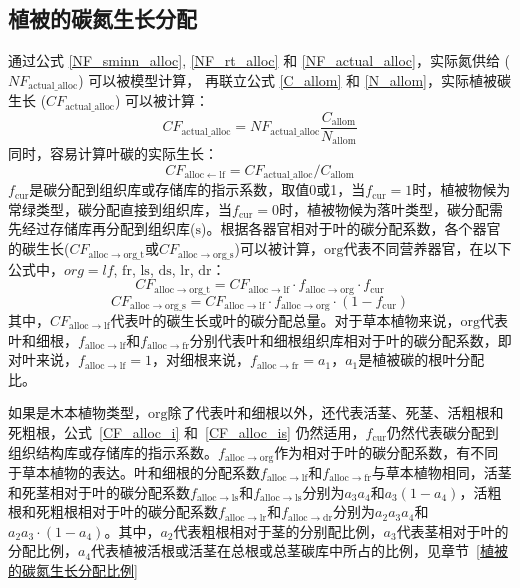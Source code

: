 \subsection{植被的碳氮生长分配}\label{植被的碳氮生长分配}
通过公式 \eqref{NF_sminn_alloc}, \eqref{NF_rt_alloc} 和 \eqref{NF_actual_alloc}，实际氮供给 ($NF_{\mathrm{actual\_alloc}}$) 可以被模型计算，
再联立公式 \eqref{C_allom} 和 \eqref{N_allom}，实际植被碳生长 ($CF_{\mathrm{actual\_alloc}}$) 可以被计算：
\begin{equation}
  CF_{\mathrm{actual\_alloc}} = NF_{\mathrm{actual\_alloc}}\frac{C_{\mathrm{allom}}}{N_{\mathrm{allom}}}
\end{equation}
同时，容易计算叶碳的实际生长：
\begin{equation}
  CF_{\mathrm{alloc \gets lf}} = CF_{\mathrm{actual\_alloc}}/C_{\mathrm{allom}}
\end{equation}
$f_{\mathrm{cur}}$是碳分配到组织库或存储库的指示系数，取值0或1，当$f_{\mathrm{cur}}=1$时，植被物候为常绿类型，碳分配直接到组织库，当$f_{\mathrm{cur}}=0$时，植被物候为落叶类型，碳分配需先经过存储库再分配到组织库(${\mathrm {s}}$)。根据各器官相对于叶的碳分配系数，各个器官的碳生长($CF_{\mathrm{alloc\rightarrow org\_t}}$或$CF_{\mathrm{alloc\rightarrow org\_s}}$)可以被计算，${\mathrm {org}}$代表不同营养器官，在以下公式中，$org=lf$, ${\mathrm {fr}}$, ${\mathrm {ls}}$, ${\mathrm {ds}}$, ${\mathrm {lr}}$, ${\mathrm {dr}}$：
\begin{equation}\label{CF_alloc_i}
  CF_{\mathrm{alloc\rightarrow org\_t}} = CF_{\mathrm{alloc\rightarrow lf}}\cdot f_{\mathrm{alloc\rightarrow org}} \cdot f_{\mathrm{cur}}
\end{equation}
\begin{equation}\label{CF_alloc_is}
  CF_{\mathrm{alloc\rightarrow org\_s}} = CF_{\mathrm{alloc\rightarrow lf}}\cdot f_{\mathrm{alloc\rightarrow org}} \cdot \left(1-f_{\mathrm{cur}}\right)
\end{equation}
其中，$CF_{\mathrm{alloc\rightarrow lf}}$代表叶的碳生长或叶的碳分配总量。对于草本植物来说，${\mathrm {org}}$代表叶和细根，$f_{\mathrm{alloc\rightarrow lf}}$和$f_{\mathrm{alloc\rightarrow fr}}$分别代表叶和细根组织库相对于叶的碳分配系数，即对叶来说，$f_{\mathrm{alloc\rightarrow lf}}=1$，对细根来说，$f_{\mathrm{alloc\rightarrow fr}}=a_1$，$a_1$是植被碳的根叶分配比。

如果是木本植物类型，${\mathrm {org}}$除了代表叶和细根以外，还代表活茎、死茎、活粗根和死粗根，公式~\eqref{CF_alloc_i} 和~\eqref{CF_alloc_is} 仍然适用，$f_{\mathrm{cur}}$仍然代表碳分配到组织结构库或存储库的指示系数。$f_{\mathrm{alloc\rightarrow org}}$作为相对于叶的碳分配系数，有不同于草本植物的表达。叶和细根的分配系数$f_{\mathrm{alloc\rightarrow lf}}$和$f_{\mathrm{alloc\rightarrow fr}}$与草本植物相同，活茎和死茎相对于叶的碳分配系数$f_{\mathrm{alloc\rightarrow ls}}$和$f_{\mathrm{alloc\rightarrow ls}}$分别为$a_3a_4$和$a_3\left(1-a_4\right)$，活粗根和死粗根相对于叶的碳分配系数$f_{\mathrm{alloc\rightarrow lr}}$和$f_{\mathrm{alloc\rightarrow dr}}$分别为$a_2a_3a_4$和$a_2a_3\cdot \left(1-a_4\right)$。其中，$a_2$代表粗根相对于茎的分别配比例，$a_3$代表茎相对于叶的分配比例，$a_4$代表植被活根或活茎在总根或总茎碳库中所占的比例，见章节~\ref{植被的碳氮生长分配比例}

